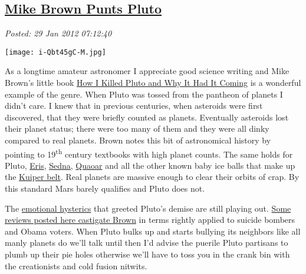 %

\subsection*{\href{http://bakerjd99.wordpress.com/2012/01/29/mike-brown-punts-pluto/}{Mike Brown Punts Pluto}}


\noindent\emph{Posted: 29 Jan 2012 07:12:40}
\vspace{6pt}


\captionsetup[floatingfigure]{labelformat=empty}
\begin{floatingfigure}[l]{0.26\textwidth}
\centering
\texttt{[image: i-Qbt45gC-M.jpg]}
\label{fig:2348X0}
\end{floatingfigure} As a longtime amateur astronomer I appreciate good science writing and
Mike Brown's little book
\href{http://www.amazon.com/How-Killed-Pluto-Why-Coming/dp/0385531087}{How
I Killed Pluto and Why It Had It Coming} is a wonderful example of the
genre. When Pluto was tossed from the pantheon of planets I didn't care.
I knew that in previous centuries, when asteroids were first discovered,
that they were briefly counted as planets. Eventually asteroids lost
their planet status; there were too many of them and they were all dinky
compared to real planets. Brown notes this bit of astronomical history
by pointing to 19\textsuperscript{th} century textbooks with high planet counts. The same
holds for Pluto,
\href{http://www.astronomytoday.com/astronomy/eris.html}{Eris},
 \href{http://www.nasa.gov/vision/universe/solarsystem/planet\_like\_body.html}{Sedna,} \href{http://news.nationalgeographic.com/news/2002/10/1003\_021007\_quaoar.html}{Quaoar}
and all the other known baby ice balls that make up the
\href{http://solarsystem.nasa.gov/planets/profile.cfm?Object=KBOs\&Display=OverviewLong}{Kuiper
belt}. Real planets are massive enough to clear their orbits of crap. By
this standard Mars barely qualifies and Pluto does not.

The \href{http://www.youtube.com/watch?v=eNaNxo9jFHE}{emotional
hysterics} that greeted Pluto's demise are still playing out.
\href{http://www.goodreads.com/review/show/257414013}{Some reviews
posted here castigate Brown} in terms rightly applied to suicide bombers
and Obama voters. When Pluto bulks up and starts bullying its neighbors
like all manly planets do we'll talk until then I'd advise the puerile
Pluto partisans to plumb up their pie holes otherwise we'll have to toss
you in the crank bin with the creationists and cold fusion nitwits.

